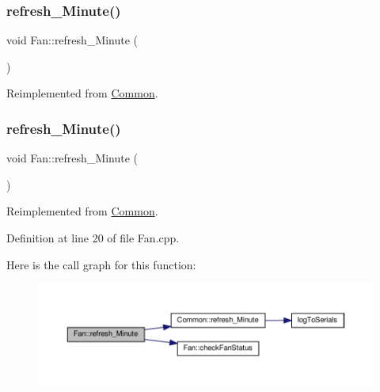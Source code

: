\subsubsection{\texorpdfstring{refresh\+\_\+\+Minute()}{refresh\_Minute()}\hspace{0.1cm}{\footnotesize\ttfamily [1/2]}}
{\footnotesize\ttfamily void Fan\+::refresh\+\_\+\+Minute (\begin{DoxyParamCaption}{ }\end{DoxyParamCaption})\hspace{0.3cm}{\ttfamily [virtual]}}



Reimplemented from \hyperlink{class_common_a14e4462a94bd118028ce1d487ca0292c}{Common}.

\mbox{\label{class_fan_ad4605196f9611585e9416bcce3d84723}} 
\subsubsection{\texorpdfstring{refresh\+\_\+\+Minute()}{refresh\_Minute()}\hspace{0.1cm}{\footnotesize\ttfamily [2/2]}}
{\footnotesize\ttfamily void Fan\+::refresh\+\_\+\+Minute (\begin{DoxyParamCaption}{ }\end{DoxyParamCaption})\hspace{0.3cm}{\ttfamily [virtual]}}



Reimplemented from \hyperlink{class_common_a14e4462a94bd118028ce1d487ca0292c}{Common}.



Definition at line 20 of file Fan.\+cpp.

Here is the call graph for this function\+:
\nopagebreak
\begin{figure}[H]
\begin{center}
\leavevmode
\includegraphics[width=350pt]{class_fan_ad4605196f9611585e9416bcce3d84723_cgraph}
\end{center}
\end{figure}
\mbox{\label{class_fan_a7f1ba729d418cc2109199b2392c37902}} 
